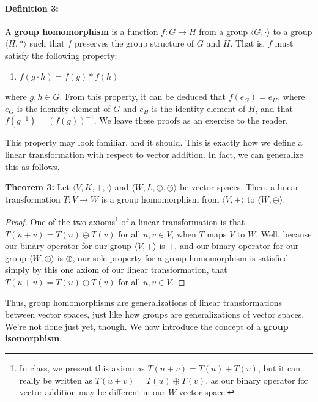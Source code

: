 \documentclass[twoside]{article}
\newcommand{\done}{\renewcommand\qedsymbol{$\blacksquare$}}
\begin{document}
\begin{spacing}{1.25}
\paragraph{Definition 3:} A \textbf{group homomorphism} is a function $f:G\rightarrow H$ from a group 
$\langle G, \cdot\rangle$ to a group $\langle H, *\rangle$ such that 
$f$ preserves the group structure of $G$ and $H$. That is, $f$ must satisfy the following
property:
\begin{enumerate}
    \item $f(g\cdot h) = f(g) * f(h)$
\end{enumerate}
where $g,h\in G$.
From this property, it can be deduced that $f(e_G) = e_H$, where $e_G$ is the
identity element of $G$ and $e_H$ is the identity element of $H$, and that 
$f(g^{-1}) = (f(g))^{-1}$. We leave these proofs as an exercise to the reader.

This property may look familiar, and it should. This is exactly how we define a linear 
transformation with respect to vector addition. In fact, we can generalize this 
as follows. 

\begin{mdframed}[roundcorner=10pt, backgroundcolor=gray!10]
  \textbf{Theorem 3:} Let $\langle V, K, +, \cdot \rangle$ and
  $\langle W, L, \oplus, \odot \rangle$ be vector spaces. Then, a linear transformation
  $T:V\rightarrow W$ is a group homomorphism from $\langle V, + \rangle$ to $\langle W, \oplus \rangle$.
\end{mdframed}
\begin{proof}
One of the two axioms\footnote[3]{In class, we present this axiom as $T(u+v) = T(u) + T(v)$, but it can really be written as $T(u+v) = T(u) \oplus T(v)$, as our binary operator for vector addition may be different in our $W$ vector space.} of 
a linear transformation is that $T(u+v) = T(u) \oplus T(v)$ for all $u,v \in V$, when $T$
maps $V$ to $W$. Well, because our binary operator for our group $\langle V, + \rangle$ is $+$, and our binary operator for our group $\langle W, \oplus \rangle$ is $\oplus$, 
our sole property for a group homomorphism is satisfied simply by this one axiom 
of our linear transformation, that $T(u+v) = T(u) \oplus T(v)$ for all $u,v \in V$.
\done 
\end{proof}
Thus, group homomorphisms are generalizations of linear transformations between 
vector spaces, just like 
how groups are generalizations of vector spaces. We're not done just yet, though.
We now introduce the concept of a \textbf{group isomorphism}.


\end{spacing}
\end{document}
